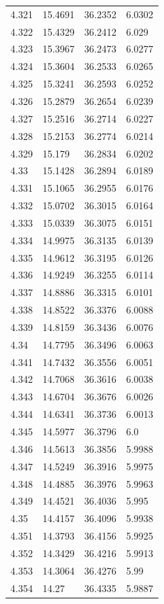 \begin{tabular}{llll}
4.321 & 15.4691 & 36.2352 & 6.0302 \\
4.322 & 15.4329 & 36.2412 & 6.029 \\
4.323 & 15.3967 & 36.2473 & 6.0277 \\
4.324 & 15.3604 & 36.2533 & 6.0265 \\
4.325 & 15.3241 & 36.2593 & 6.0252 \\
4.326 & 15.2879 & 36.2654 & 6.0239 \\
4.327 & 15.2516 & 36.2714 & 6.0227 \\
4.328 & 15.2153 & 36.2774 & 6.0214 \\
4.329 & 15.179 & 36.2834 & 6.0202 \\
4.33 & 15.1428 & 36.2894 & 6.0189 \\
4.331 & 15.1065 & 36.2955 & 6.0176 \\
4.332 & 15.0702 & 36.3015 & 6.0164 \\
4.333 & 15.0339 & 36.3075 & 6.0151 \\
4.334 & 14.9975 & 36.3135 & 6.0139 \\
4.335 & 14.9612 & 36.3195 & 6.0126 \\
4.336 & 14.9249 & 36.3255 & 6.0114 \\
4.337 & 14.8886 & 36.3315 & 6.0101 \\
4.338 & 14.8522 & 36.3376 & 6.0088 \\
4.339 & 14.8159 & 36.3436 & 6.0076 \\
4.34 & 14.7795 & 36.3496 & 6.0063 \\
4.341 & 14.7432 & 36.3556 & 6.0051 \\
4.342 & 14.7068 & 36.3616 & 6.0038 \\
4.343 & 14.6704 & 36.3676 & 6.0026 \\
4.344 & 14.6341 & 36.3736 & 6.0013 \\
4.345 & 14.5977 & 36.3796 & 6.0 \\
4.346 & 14.5613 & 36.3856 & 5.9988 \\
4.347 & 14.5249 & 36.3916 & 5.9975 \\
4.348 & 14.4885 & 36.3976 & 5.9963 \\
4.349 & 14.4521 & 36.4036 & 5.995 \\
4.35 & 14.4157 & 36.4096 & 5.9938 \\
4.351 & 14.3793 & 36.4156 & 5.9925 \\
4.352 & 14.3429 & 36.4216 & 5.9913 \\
4.353 & 14.3064 & 36.4276 & 5.99 \\
4.354 & 14.27 & 36.4335 & 5.9887 \\

\end{tabular}
